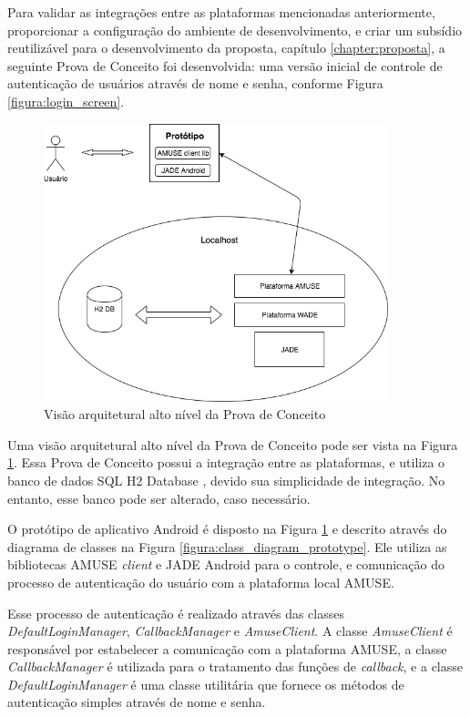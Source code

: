  Para validar as integrações entre as plataformas mencionadas anteriormente,
  proporcionar a configuração do ambiente de desenvolvimento, e criar um
  subsídio reutilizável para o desenvolvimento da proposta, capítulo
  \ref{chapter:proposta}, a seguinte Prova de Conceito foi desenvolvida: uma
  versão inicial de controle de autenticação de usuários através de nome e
  senha, conforme Figura \ref{figura:login_screen}.

  \begin{figure}[h]
    \centering
    \includegraphics[width=10cm]{figuras/platforms_overview}
    \caption{Visão arquitetural alto nível da Prova de Conceito}
    \label{figura:platforms_overview}
  \end{figure}

  Uma visão arquitetural alto nível da Prova de Conceito pode ser vista na
  Figura \ref{figura:platforms_overview}. Essa Prova de Conceito possui a
  integração entre as plataformas, e utiliza o banco de dados SQL H2 Database
  \cite{h2db}, devido sua simplicidade de integração. No entanto, esse banco
  pode ser alterado, caso necessário.

  O protótipo de aplicativo Android é disposto na Figura
  \ref{figura:platforms_overview} e descrito através do diagrama de classes na
  Figura \ref{figura:class_diagram_prototype}. Ele utiliza as bibliotecas AMUSE
  \textit{client} e JADE Android para o controle, e comunicação do processo de
  autenticação do usuário com a plataforma local AMUSE.

  Esse processo de autenticação é realizado através das classes
  \textit{DefaultLoginManager}, \textit{CallbackManager} e
  \textit{AmuseClient}. A classe \textit{AmuseClient} é responsável por
  estabelecer a comunicação com a plataforma AMUSE, a classe
  \textit{CallbackManager} é utilizada para o tratamento das funções de
  \textit{callback}, e a classe \textit{DefaultLoginManager} é uma classe
  utilitária que fornece os métodos de autenticação simples através de nome e
  senha.

